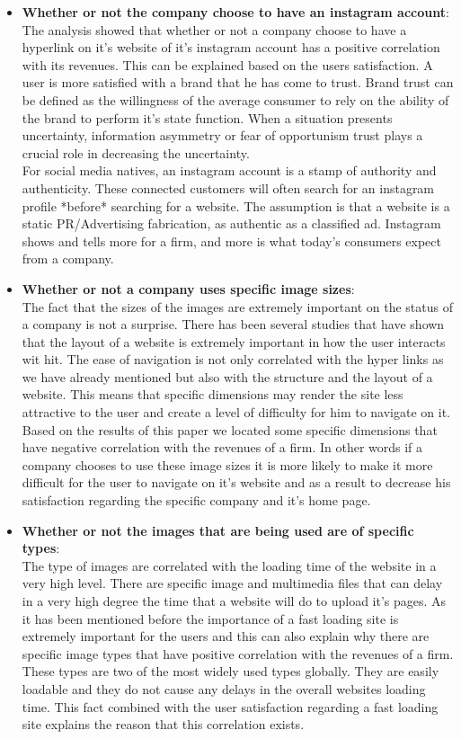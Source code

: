 \documentclass{book}
\begin{document}
\begin{itemize}
\item \textbf{ Whether or not the company choose to have an instagram account}: \\
The analysis showed that whether or not a company choose to have a hyperlink on it's website of it's instagram account has a positive correlation with its revenues. This can be explained based on the users satisfaction. A user is more satisfied with a brand that he has come to trust. Brand trust can be defined\cite{key55} as the willingness of the average consumer to rely on the ability of the brand to perform it's state function. When a situation presents uncertainty, information asymmetry or fear of opportunism trust plays a crucial role in decreasing the uncertainty. \\
For social media natives, an instagram account is a stamp of authority and authenticity. These connected customers will often search for an instagram profile *before* searching for a website. The assumption is that a website is a static PR/Advertising fabrication, as authentic as a classified ad.  Instagram shows and tells more for a firm, and more is what today’s consumers expect from a company.
\item \textbf{Whether or not a company uses specific image sizes}:\\
The fact that the sizes of the images are extremely important on the status of a company is not a surprise. There has been several studies that have shown that the layout of a website is extremely important in how the user interacts wit hit. The ease of navigation is not only correlated with the hyper links as we have already mentioned but also with the structure and the layout of a website. This means that specific dimensions may render the site less attractive to the user and create a level of difficulty for him to navigate on it.\\
Based on the results of this paper we located some specific dimensions that have negative correlation with the revenues of a firm. In other words if a company chooses to use these image sizes it is more likely to make it more difficult for the user to navigate on it's website and as a result to decrease his satisfaction regarding the specific company and it's home page.   
\item \textbf{Whether or not the images that are being used are of specific types}:\\
The type of images are correlated with the loading time of the website in a very high level. There are specific image and multimedia files that can delay in a very high degree the time that a website will do to upload it's pages. As it has been mentioned before the importance of a fast loading site is extremely important for the users and this can also explain why there are specific image types that have positive correlation with the revenues of a firm.\\
These types are two of the most widely used types globally. They are easily loadable and they do not cause any delays in the overall websites loading time. This fact combined with the user satisfaction regarding a fast loading site explains the reason that this correlation exists.
\end{itemize}
\end{document}

